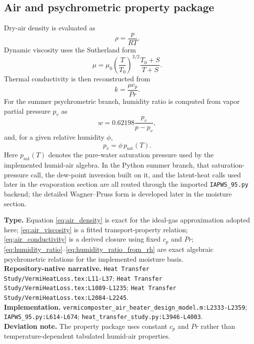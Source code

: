 \documentclass[11pt]{article}
\newcommand{\srcref}[1]{\nolinkurl{#1}}
\newcommand{\filepath}[1]{\nolinkurl{#1}}
\begin{document}
\subsection{Air and psychrometric property package}
Dry-air density is evaluated as
\begin{equation}
\label{eq:air_density}
\rho=\frac{p}{RT}.
\end{equation}
Dynamic viscosity uses the Sutherland form
\begin{equation}
\label{eq:air_viscosity}
\mu=\mu_0\left(\frac{T}{T_0}\right)^{3/2}\frac{T_0+S}{T+S}.
\end{equation}
Thermal conductivity is then reconstructed from
\begin{equation}
\label{eq:air_conductivity}
k=\frac{\mu c_p}{Pr}.
\end{equation}
For the summer psychrometric branch, humidity ratio is computed from vapor partial pressure \(p_v\) as
\begin{equation}
\label{eq:humidity_ratio}
w=0.62198\frac{p_v}{p-p_v},
\end{equation}
and, for a given relative humidity \(\phi\),
\begin{equation}
\label{eq:humidity_ratio_from_rh}
p_v=\phi\,p_{\mathrm{sat}}(T).
\end{equation}
Here \(p_{\mathrm{sat}}(T)\) denotes the pure-water saturation pressure used by the implemented humid-air algebra. In the Python summer branch, that saturation-pressure call, the dew-point inversion built on it, and the latent-heat calls used later in the evaporation section are all routed through the imported \filepath{IAPWS_95.py} backend; the detailed Wagner--Pruss form is developed later in the moisture section.

\textbf{Type.} Equation \eqref{eq:air_density} is exact for the ideal-gas approximation adopted here; \eqref{eq:air_viscosity} is a fitted transport-property relation; \eqref{eq:air_conductivity} is a derived closure using fixed \(c_p\) and \(Pr\); \eqref{eq:humidity_ratio}--\eqref{eq:humidity_ratio_from_rh} are exact algebraic psychrometric relations for the implemented moisture basis. \\
\textbf{Repository-native narrative.} \filepath{Heat Transfer Study/VermiHeatLoss.tex:L11-L37}; \filepath{Heat Transfer Study/VermiHeatLoss.tex:L1089-L1235}; \filepath{Heat Transfer Study/VermiHeatLoss.tex:L2084-L2245}. \\
\textbf{Implementation.} \srcref{vermicomposter_air_heater_design_model.m:L2333-L2359}; \srcref{IAPWS_95.py:L614-L674}; \srcref{heat_transfer_study.py:L3946-L4003}. \\
\textbf{Deviation note.} The property package uses constant \(c_p\) and \(Pr\) rather than temperature-dependent tabulated humid-air properties.
\end{document}
